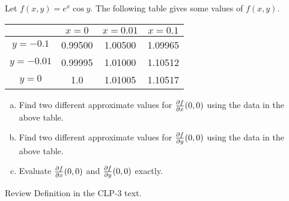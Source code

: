 


\subsection*{\Conceptual}

\begin{question}
Let $f(x,y) = e^x\cos y$. The following table gives some values of $f(x,y)$.

\begin{center}
\renewcommand{\arraystretch}{1.3}
     \begin{tabular}{c|c|c|c|}
       & $x=0$ & $x=0.01$ & $x=0.1$  \\    
    \hline
     $y=-0.1$  & 0.99500 & 1.00500 & 1.09965 \\ \hline
     $y=-0.01$ & 0.99995 & 1.01000 & 1.10512 \\ \hline
     $y=0$     & 1.0     & 1.01005 & 1.10517 \\ \hline
     \end{tabular}
\renewcommand{\arraystretch}{1.0}
\end{center}

\begin{enumerate}[(a)]
\item
Find two different approximate values for $\pdiff{f}{x}(0,0)$ using the data in 
the above table.
\item
Find two different approximate values for $\pdiff{f}{y}(0,0)$ using the data in the above table.
\item
Evaluate $\pdiff{f}{x}(0,0)$ and $\pdiff{f}{y}(0,0)$ exactly.
\end{enumerate}
\end{question}

\begin{hint}
Review Definition   in the CLP-3 text.
\end{hint}

